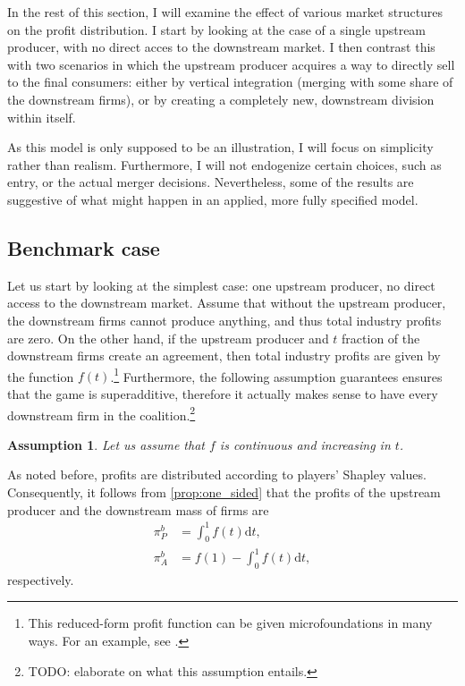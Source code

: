 \documentclass[a4paper]{article}
\newtheorem{assumption}{Assumption}
\newcommand{\dt}{\mathrm{d}t}
\begin{document}
In the rest of this section, I will examine the effect of various market structures on the profit distribution.
I start by looking at the case of a single upstream producer, with no direct acces to the downstream market.
I then contrast this with two scenarios in which the upstream producer acquires a way to directly sell to the final consumers: either by vertical integration (merging with some share of the downstream firms), or by creating a completely new, downstream division within itself.

As this model is only supposed to be an illustration, I will focus on simplicity rather than realism.
Furthermore, I will not endogenize certain choices, such as entry, or the actual merger decisions.
Nevertheless, some of the results are suggestive of what might happen in an applied, more fully specified model.


\subsection{Benchmark case}

Let us start by looking at the simplest case: one upstream producer, no direct access to the downstream market.
Assume that without the upstream producer, the downstream firms cannot produce anything, and thus total industry profits are zero.
On the other hand, if the upstream producer and $t$ fraction of the downstream firms create an agreement, then total industry profits are given by the function $f(t)$.\footnote{
    This reduced-form profit function can be given microfoundations in many ways.
    For an example, see \textcite{stancsics2023hybrid}.
}
Furthermore, the following assumption guarantees ensures that the game is superadditive, therefore it actually makes sense to have every downstream firm in the coalition.\footnote{
    TODO: elaborate on what this assumption entails.
}
\begin{assumption}
    Let us assume that $f$ is continuous and increasing in $t$.
\end{assumption}

As noted before, profits are distributed according to players' Shapley values.
Consequently, it follows from \cref{prop:one_sided} that the profits of the upstream producer and the downstream mass of firms are
\begin{align*}
    \pi_P^b & = \int_0^1 f(t) \dt, \\
    \pi_A^b & = f(1) - \int_0^1 f(t) \dt,
\end{align*}
respectively.
\end{document}

